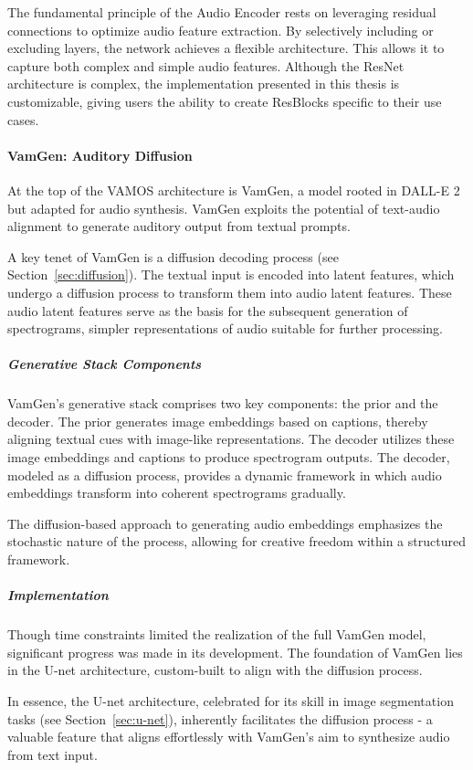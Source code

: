 The fundamental principle of the Audio Encoder rests on leveraging residual connections to optimize audio feature extraction. By selectively including or excluding layers, the network achieves a flexible architecture. This allows it to capture both complex and simple audio features. Although the ResNet architecture is complex, the implementation presented in this thesis is customizable, giving users the ability to create ResBlocks specific to their use cases.

\paragraph{VamGen: Auditory Diffusion}

At the top of the VAMOS architecture is VamGen, a model rooted in DALL-E 2 but adapted for audio synthesis. VamGen exploits the potential of text-audio alignment to generate auditory output from textual prompts.

A key tenet of VamGen is a diffusion decoding process (see Section~\ref{sec:diffusion}). The textual input is encoded into latent features, which undergo a diffusion process to transform them into audio latent features. These audio latent features serve as the basis for the subsequent generation of spectrograms, simpler representations of audio suitable for further processing.

\subparagraph{Generative Stack Components}

VamGen's generative stack comprises two key components: the prior and the decoder. The prior generates image embeddings based on captions, thereby aligning textual cues with image-like representations. The decoder utilizes these image embeddings and captions to produce spectrogram outputs. The decoder, modeled as a diffusion process, provides a dynamic framework in which audio embeddings transform into coherent spectrograms gradually.

The diffusion-based approach to generating audio embeddings emphasizes the stochastic nature of the process, allowing for creative freedom within a structured framework.

\subparagraph{Implementation}

Though time constraints limited the realization of the full VamGen model, significant progress was made in its development. The foundation of VamGen lies in the U-net architecture, custom-built to align with the diffusion process.

In essence, the U-net architecture, celebrated for its skill in image segmentation tasks (see Section~\ref{sec:u-net}), inherently facilitates the diffusion process - a valuable feature that aligns effortlessly with VamGen's aim to synthesize audio from text input.

